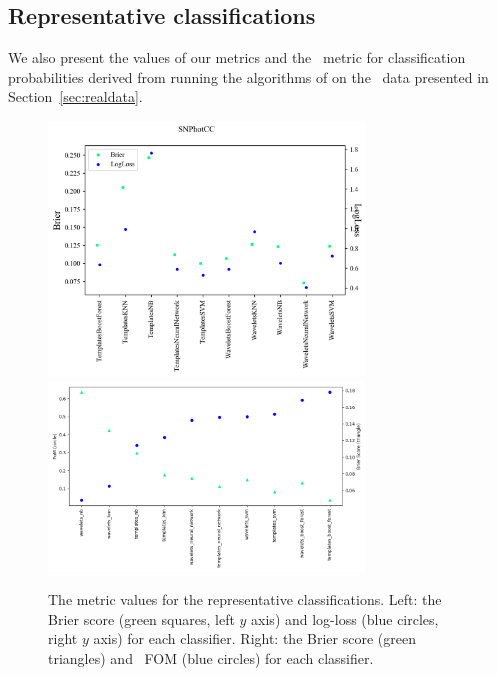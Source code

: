 
\subsection{Representative classifications}
\label{sec:realresults}

We also present the values of our metrics and the \snphotcc\ metric for classification probabilities derived from running the algorithms of \cite{lochner_photometric_2016} on the \snphotcc\ data presented in Section~\ref{sec:realdata}.

\begin{figure}
	\begin{center}
		\includegraphics[width=0.75\textwidth]{./fig/SNPhotCC_res.png}
	  \includegraphics[width=0.75\textwidth]{./fig/fom_vs_brier.png}
		\caption{The metric values for the representative classifications.
		Left: the Brier score (green squares, left $y$ axis) and log-loss (blue circles, right $y$ axis) for each classifier.
		Right: the Brier score (green triangles) and \snphotcc\ FOM (blue circles) for each classifier.
		\label{fig:real_metric_compare}}
	\end{center}
\end{figure}

